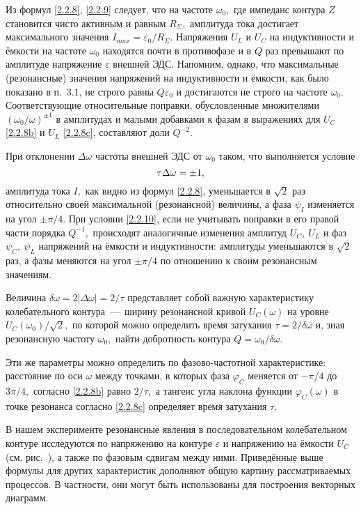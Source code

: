 Из формул \eqref{2.2.8}, \eqref{2.2.9} следует, что на частоте $\omega_0,$ где импеданс контура $Z$ становится чисто активным и равным $R_{\Sigma},$ амплитуда тока достигает максимального значения $I_{max}=\varepsilon_0/R_{\Sigma}.$ Напряжения $U_L$ и $U_C$ на индуктивности и ёмкости на частоте $\omega_0$ находятся почти в противофазе и в $Q$ раз превышают по амплитуде напряжение $\varepsilon$ внешней ЭДС. Напомним, однако, что максимальные (резонансные) значения напряжений на индуктивности и ёмкости, как было показано в п.~3.1, не строго равны $Q\varepsilon_0$ и достигаются не строго на частоте $\omega_0.$ Соответствующие относительные поправки, обусловленные множителями $(\omega_0/\omega)^{\pm1}$ в амплитудах и малыми добавками к фазам в выражениях для $U_C$ \eqref{2.2.8b} и $U_L$ \eqref{2.2.8c}, составляют доли $Q^{-2}.$

При отклонении $\Delta\omega$ частоты внешней ЭДС от $\omega_0$ таком, что выполняется условие
\begin{equation}\eqmark{2.2.10}
\tau\Delta\omega=\pm1,
\end{equation}
амплитуда тока $I,$ как видно из формул \eqref{2.2.8}, уменьшается в $\sqrt{2}$ раз относительно своей максимальной (резонансной) величины, а фаза $\psi_I$ изменяется на угол $\pm\pi/4.$ При условии \eqref{2.2.10}, если не учитывать поправки в его правой части порядка $Q^{-1},$ происходят аналогичные изменения амплитуд $U_C,~U_L $ и фаз $\psi_C,~\psi_L$ напряжений на ёмкости и индуктивности: амплитуды уменьшаются в $\sqrt{2}$ раз, а фазы меняются на угол $\pm\pi/4$ по отношению к своим резонансным значениям.

Величина $\delta\omega=2|\Delta\omega|=2/\tau$ представляет собой важную характеристику колебательного контура~---~ширину резонансной кривой $U_C(\omega)$ на уровне $U_C(\omega_0)/\sqrt{2},$ по которой можно определить время затухания $\tau=2/\delta\omega$ и, зная резонансную частоту $\omega_0,$ найти добротность контура $Q=\omega_0/\delta\omega.$

Эти же параметры можно определить по фазово-частотной характеристике: расстояние по оси $\omega$ между точками, в которых фаза $\varphi_C$ меняется от $-\pi/4$ до $3\pi/4,$ согласно \eqref{2.2.8b} равно $2/\tau,$ а тангенс угла наклона функции $\varphi_C(\omega)$ в точке резонанса согласно \eqref{2.2.8c} определяет время затухания $\tau.$

В нашем эксперименте резонансные явления в последовательном колебательном контуре исследуются по напряжению на контуре $\varepsilon$ и напряжению на ёмкости $U_C$ (см. рис.~), а также по фазовым сдвигам между ними. Приведённые выше формулы для других характеристик дополняют общую картину рассматриваемых процессов. В частности, они могут быть использованы для построения векторных диаграмм.

